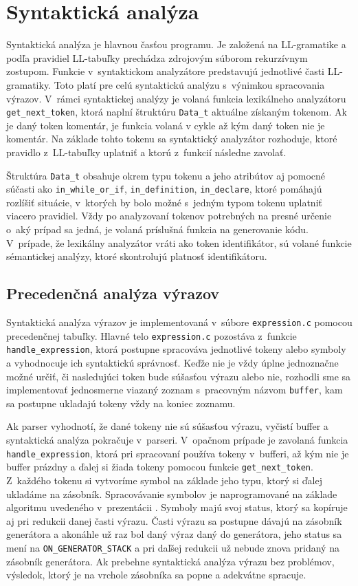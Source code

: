 \documentclass [11pt, a4paper]{article}
\begin{document}
\section{Syntaktická analýza}
Syntaktická analýza je hlavnou časťou programu.
Je založená na LL-gramatike a podľa pravidiel LL-tabuľky prechádza zdrojovým súborom rekurzívnym zostupom. Funkcie v~syntaktickom analyzátore predstavujú jednotlivé časti LL-gramatiky. Toto platí pre celú syntaktickú analýzu s~výnimkou spracovania výrazov. V~rámci syntaktickej analýzy je volaná funkcia lexikálneho analyzátoru \texttt{get\_next\_token}, ktorá naplní štruktúru \texttt{Data\_t} aktuálne získaným tokenom. Ak je daný token komentár, je funkcia volaná v cykle až kým daný token nie je komentár. Na základe tohto tokenu sa syntaktický analyzátor rozhoduje, ktoré pravidlo z~LL-tabuľky uplatniť a ktorú z~funkcií následne zavolať.


Štruktúra \texttt{Data\_t} obsahuje okrem typu tokenu a jeho atribútov aj pomocné súčasti ako \texttt{in\_while\_or\_if}, \texttt{in\_definition}, \texttt{in\_declare}, ktoré pomáhajú rozlíšiť situácie, v~ktorých by bolo možné s~jedným typom tokenu uplatniť viacero pravidiel. Vždy po analyzovaní tokenov potrebných na presné určenie o~aký prípad sa jedná, je volaná príslušná funkcia na generovanie kódu. 
V~prípade, že lexikálny analyzátor vráti ako token identifikátor, sú volané funkcie sémantickej analýzy, ktoré skontrolujú platnosť identifikátoru.


\subsection{Precedenčná analýza výrazov}
Syntaktická analýza výrazov je implementovaná v~súbore \texttt{expression.c} pomocou precedenčnej tabuľky. Hlavné telo \texttt{expression.c} pozostáva z~funkcie \texttt{handle\_expression}, ktorá postupne spracováva jednotlivé tokeny alebo symboly a vyhodnocuje ich syntaktickú správnosť. Keďže nie je vždy úplne jednoznačne možné určiť, či nasledujúci token bude súšasťou výrazu alebo nie, rozhodli sme sa implementovať jednosmerne viazaný zoznam s~pracovným názvom \texttt{buffer}, kam sa postupne ukladajú tokeny vždy na koniec zoznamu.

 Ak parser vyhodnotí, že dané tokeny nie sú súšasťou výrazu, vyčistí buffer a syntaktická analýza pokračuje v~parseri. V~opačnom prípade je zavolaná funkcia \texttt{handle\_expression}, ktorá pri spracovaní používa tokeny v~bufferi, až kým nie je buffer prázdny a ďalej si žiada tokeny pomocou funkcie \texttt{get\_next\_token}. Z~každého tokenu si vytvoríme symbol na základe jeho typu, ktorý si ďalej ukladáme na zásobník. Spracovávanie symbolov je naprogramované na základe algoritmu uvedeného v~prezentácii \cite{IFJpred}. Symboly majú svoj status, ktorý sa kopíruje aj pri redukcii danej časti výrazu. Časti výrazu sa postupne dávajú na zásobník generátora a akonáhle už raz bol daný výraz daný do generátora, jeho status sa mení na \texttt{ON\_GENERATOR\_STACK} a pri daľšej redukcii už nebude znova pridaný na zásobník generátora. Ak prebehne syntaktická analýza výrazu bez problémov, výsledok, ktorý je na vrchole zásobníka sa popne a adekvátne spracuje.
\end{document}
